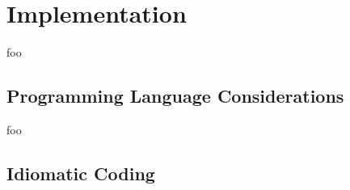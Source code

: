 
\section{Implementation}





foo


\subsection{Programming Language Considerations}




foo


\subsection{Idiomatic Coding}


